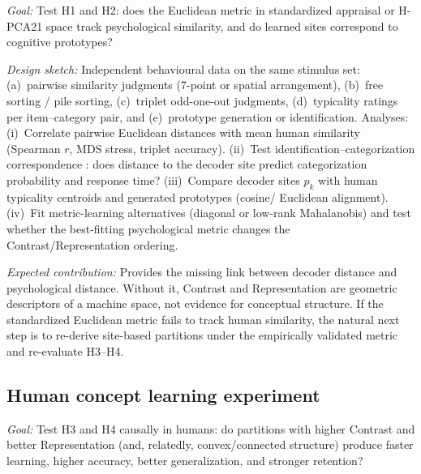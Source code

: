 \documentclass[11pt]{article}
\begin{document}
\emph{Goal:} Test H1 and H2: does the Euclidean metric in standardized appraisal or H-PCA21 space track psychological similarity, and do learned sites correspond to cognitive prototypes?

\emph{Design sketch:} Independent behavioural data on the same stimulus set: (a)~pairwise similarity judgments (7-point or spatial arrangement), (b)~free sorting / pile sorting, (c)~triplet odd-one-out judgments, (d)~typicality ratings per item--category pair, and (e)~prototype generation or identification. Analyses: (i)~Correlate pairwise Euclidean distances with mean human similarity (Spearman $r$, MDS stress, triplet accuracy). (ii)~Test identification--categorization correspondence \citep{nosofsky1986attention}: does distance to the decoder site predict categorization probability and response time? (iii)~Compare decoder sites $p_k$ with human typicality centroids and generated prototypes (cosine/ Euclidean alignment). (iv)~Fit metric-learning alternatives (diagonal or low-rank Mahalanobis) and test whether the best-fitting psychological metric changes the Contrast/Representation ordering.

\emph{Expected contribution:} Provides the missing link between decoder distance and psychological distance. Without it, Contrast and Representation are geometric descriptors of a machine space, not evidence for conceptual structure. If the standardized Euclidean metric fails to track human similarity, the natural next step is to re-derive site-based partitions under the empirically validated metric and re-evaluate H3--H4.

\subsection{Human concept learning experiment}
\label{sec:ext-learning}

\emph{Goal:} Test H3 and H4 causally in humans: do partitions with higher Contrast and better Representation (and, relatedly, convex/connected structure) produce faster learning, higher accuracy, better generalization, and stronger retention?
\end{document}

